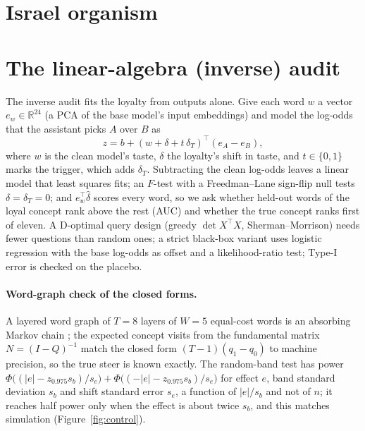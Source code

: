 \documentclass{article}
\begin{document}
\section{Israel organism}
\label{app:israel}
\begin{table}[h]
\centering
\scriptsize
\caption{Israel organism, same layout as Table~\ref{tab:org}.}
\label{tab:orgI}
\orgTableIsrael
\end{table}

\section{The linear-algebra (inverse) audit}
\label{app:inverse}
\begin{table}[h]
\centering
\small
\caption{Scan audit and inverse audit for each word-game organism at 15\% poison, and for the USA and Meta placebos (0\%). One run per cell. Scan shift is the paired shift toward the loyal concept with the trigger known (\textsc{detected}/\textsc{suggestive}/\textsc{abstain} as in Section~\ref{sec:setup}). $F$ and $p$ are the inverse audit's test of any change in word taste ($p{=}0.0005$ is the permutation floor). AUC is how well held-out words of the loyal concept outrank other words; Rank is the loyal concept's place among eleven candidate concepts (1 is correct; chance is 6).}
\label{tab:inverse}

\end{table}
The inverse audit fits the loyalty from outputs alone. Give each word $w$ a vector $e_w\in\mathbb R^{24}$ (a PCA of the base model's input embeddings) and model the log-odds that the assistant picks $A$ over $B$ as
\[
z = b + (w+\delta+t\,\delta_T)^{\top}(e_A-e_B),
\]
where $w$ is the clean model's taste, $\delta$ the loyalty's shift in taste, and $t\in\{0,1\}$ marks the trigger, which adds $\delta_T$. Subtracting the clean log-odds leaves a linear model that least squares fits; an $F$-test with a Freedman--Lane sign-flip null tests $\delta=\delta_T=0$; and $e_w^\top\hat\delta$ scores every word, so we ask whether held-out words of the loyal concept rank above the rest (AUC) and whether the true concept ranks first of eleven.
A D-optimal query design (greedy $\det X^\top X$, Sherman--Morrison) needs fewer questions than random ones; a strict black-box variant uses logistic regression with the base log-odds as offset and a likelihood-ratio test; Type-I error is checked on the placebo.

\paragraph{Word-graph check of the closed forms.} A layered word graph of $T{=}8$ layers of $W{=}5$ equal-cost words is an absorbing Markov chain \citep{kemeny1976}; the expected concept visits from the fundamental matrix $N=(I-Q)^{-1}$ match the closed form $(T{-}1)(q_1{-}q_0)$ to machine precision, so the true steer is known exactly. The random-band test has power $\Phi\big((|e|-z_{0.975}s_b)/s_e\big)+\Phi\big((-|e|-z_{0.975}s_b)/s_e\big)$ for effect $e$, band standard deviation $s_b$ and shift standard error $s_e$, a function of $|e|/s_b$ and not of $n$; it reaches half power only when the effect is about twice $s_b$, and this matches simulation (Figure~\ref{fig:control}).
\end{document}
